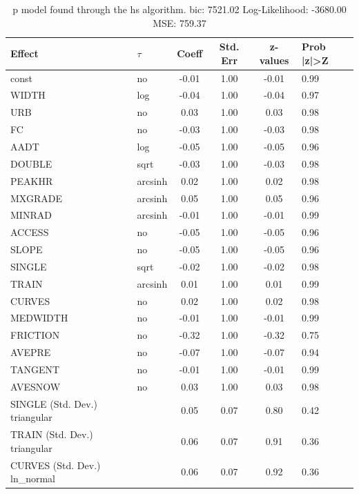 \begin{table}
	\caption{p model found through the hs algorithm. bic: 7521.02 Log-Likelihood: -3680.00 MSE: 759.37}
	\begin{center}
		\begin{tabular}{|l|l|c|c|c|l|}
			\hline
			Effect & $\tau$ & Coeff & Std. Err & z-values & Prob |z|>Z \\
			\hline
			const & no & -0.01 & 1.00 & -0.01 & 0.99 \\
			\hline
			WIDTH & log & -0.04 & 1.00 & -0.04 & 0.97 \\
			\hline
			URB & no & 0.03 & 1.00 & 0.03 & 0.98 \\
			\hline
			FC & no & -0.03 & 1.00 & -0.03 & 0.98 \\
			\hline
			AADT & log & -0.05 & 1.00 & -0.05 & 0.96 \\
			\hline
			DOUBLE & sqrt & -0.03 & 1.00 & -0.03 & 0.98 \\
			\hline
			PEAKHR & arcsinh & 0.02 & 1.00 & 0.02 & 0.98 \\
			\hline
			MXGRADE & arcsinh & 0.05 & 1.00 & 0.05 & 0.96 \\
			\hline
			MINRAD & arcsinh & -0.01 & 1.00 & -0.01 & 0.99 \\
			\hline
			ACCESS & no & -0.05 & 1.00 & -0.05 & 0.96 \\
			\hline
			SLOPE & no & -0.05 & 1.00 & -0.05 & 0.96 \\
			\hline
			SINGLE & sqrt & -0.02 & 1.00 & -0.02 & 0.98 \\
			\hline
			TRAIN & arcsinh & 0.01 & 1.00 & 0.01 & 0.99 \\
			\hline
			CURVES & no & 0.02 & 1.00 & 0.02 & 0.98 \\
			\hline
			MEDWIDTH & no & -0.01 & 1.00 & -0.01 & 0.99 \\
			\hline
			FRICTION & no & -0.32 & 1.00 & -0.32 & 0.75 \\
			\hline
			AVEPRE & no & -0.07 & 1.00 & -0.07 & 0.94 \\
			\hline
			TANGENT & no & -0.01 & 1.00 & -0.01 & 0.99 \\
			\hline
			AVESNOW & no & 0.03 & 1.00 & 0.03 & 0.98 \\
			\hline
			SINGLE (Std. Dev.) triangular &  & 0.05 & 0.07 & 0.80 & 0.42 \\
			\hline
			TRAIN (Std. Dev.) triangular &  & 0.06 & 0.07 & 0.91 & 0.36 \\
			\hline
			CURVES (Std. Dev.) ln_normal &  & 0.06 & 0.07 & 0.92 & 0.36 \\

\end{tabular}
\end{center}
\end{table}
